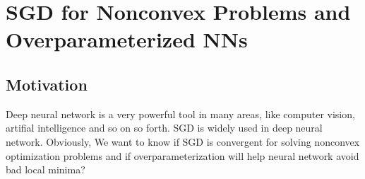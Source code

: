 \documentclass[12pt]{report}
\begin{document}

\maketitle






\section{SGD for Nonconvex Problems and Overparameterized NNs}
\subsection{Motivation}
Deep neural network is a very powerful tool in many areas, like computer vision, artifial intelligence and so on so forth. SGD is widely used in deep neural network. Obviously, We want to know if SGD is convergent for solving nonconvex optimization problems and if overparameterization will help neural network avoid bad local minima?
\end{document}
